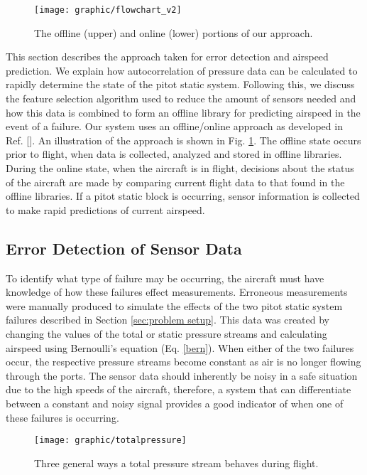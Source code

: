 \documentclass[]{aiaa-tc}
\begin{document}
\begin{figure}
\centering
\texttt{[image: graphic/flowchart\_v2]}
\caption{The offline (upper) and online (lower) portions of our approach. }
\label{fig:flowchart}
\end{figure}

This section describes the approach taken for error detection and airspeed prediction. We explain how autocorrelation of pressure data can be calculated to rapidly determine the state of the pitot static system.  Following this, we discuss the feature selection algorithm used to reduce the amount of sensors needed and how this data is combined to form an offline library for predicting airspeed in the event of a failure. Our system uses an offline/online approach as developed in Ref. []. An illustration of the approach is shown in Fig. \ref{fig:flowchart}. The offline state occurs prior to flight, when data is collected, analyzed and stored in offline libraries. During the online state, when the aircraft is in flight, decisions about the status of the aircraft are made by comparing current flight data to that found in the offline libraries. If a pitot static block is occurring, sensor information is collected to make rapid predictions of current airspeed. 


\subsection{Error Detection of Sensor Data }
\label{sec:error detection}

To identify what type of failure may be occurring, the aircraft must have knowledge of how these failures effect measurements. Erroneous measurements were manually produced to simulate the effects of the two pitot static system failures described in Section \ref{sec:problem setup}. This data was created by changing the values of the total or static pressure streams and calculating airspeed using Bernoulli's equation (Eq. \ref{bern}). When either of the two failures occur, the respective pressure streams become constant as air is no longer flowing through the ports. The sensor data should inherently be noisy in a safe situation due to the high speeds of the aircraft, therefore, a system that can differentiate between a constant and noisy signal provides a good indicator of when one of these failures is occurring. 

\begin{figure}
\centering
\texttt{[image: graphic/totalpressure]}
\caption{\label{fig:pressurebehavior} Three general ways a total pressure stream behaves during flight.}
\end{figure}
\end{document}
